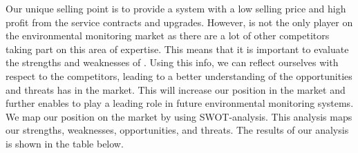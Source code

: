 Our unique selling point is to provide a system with a low selling price and high profit from the service contracts and upgrades. However, \CompanyName{} is not the only player on the environmental monitoring market as there are a lot of other competitors taking part on this area of expertise. This means that it is important to evaluate the strengths and weaknesses of \CompanyName. Using this info, we can reflect ourselves with respect to the competitors, leading to a better understanding of the opportunities and threats \CompanyName has in the market.
This will increase our position in the market and further enables \CompanyName to play a leading role in future environmental monitoring systems.\\

We map our position on the market by using SWOT-analysis. This analysis maps our strengths, weaknesses, opportunities, and threats. The results of our analysis is shown in the table below.

%

